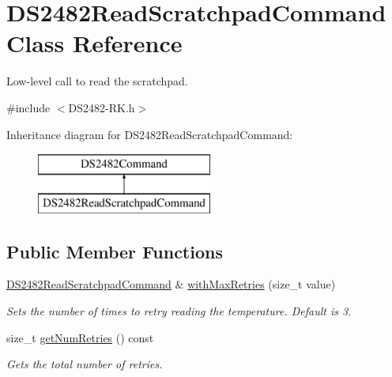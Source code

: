 \hypertarget{class_d_s2482_read_scratchpad_command}{}\section{D\+S2482\+Read\+Scratchpad\+Command Class Reference}
\label{class_d_s2482_read_scratchpad_command}


Low-\/level call to read the scratchpad.  




{\ttfamily \#include $<$D\+S2482-\/\+R\+K.\+h$>$}

Inheritance diagram for D\+S2482\+Read\+Scratchpad\+Command\+:\begin{figure}[H]
\begin{center}
\leavevmode
\includegraphics[height=2.000000cm]{class_d_s2482_read_scratchpad_command}
\end{center}
\end{figure}
\subsection*{Public Member Functions}
\begin{DoxyCompactItemize}
\item 
\mbox{\label{class_d_s2482_read_scratchpad_command_a816a8806e254ed36e677eb060820e5de}} 
\mbox{\hyperlink{class_d_s2482_read_scratchpad_command}{D\+S2482\+Read\+Scratchpad\+Command}} \& \mbox{\hyperlink{class_d_s2482_read_scratchpad_command_a816a8806e254ed36e677eb060820e5de}{with\+Max\+Retries}} (size\+\_\+t value)
\begin{DoxyCompactList}\small\item\em Sets the number of times to retry reading the temperature. Default is 3. \end{DoxyCompactList}\item 
size\+\_\+t \mbox{\hyperlink{class_d_s2482_read_scratchpad_command_a41ec4653739bf4d13351a25800fedb91}{get\+Num\+Retries}} () const
\begin{DoxyCompactList}\small\item\em Gets the total number of retries. \end{DoxyCompactList}\end{DoxyCompactItemize}
